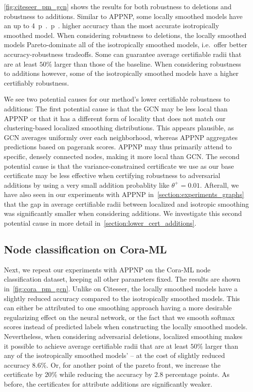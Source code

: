 \autoref{fig:citeseer_pm_gcn} shows the results for both robustness to deletions and robustness to additions.
Similar to APPNP, some locally smoothed models have an up to \SI{4}{p{.}p{.}} higher accuracy than the most accurate isotropically smoothed model.
When considering robustness to deletions, the locally smoothed models Pareto-dominate all of the isotropically smoothed models, i.e.~offer better accuracy-robustness tradeoffs. Some can guarantee average certifiable radii that are at least $50\%$ larger than those of the baseline.
When considering robustness to additions however, some of the isotropically smoothed models have a higher certifiably robustness.

We see two potential causes for our method's lower certifiable robustness to additions:
The first potential cause is that the GCN may be less local than APPNP 
or that it has a different form of locality that does not match our clustering-based localized smoothing distributions.
This appears plausible, as GCN averages uniformly over each neighborhood, whereas APPNP aggregates predictions based on pagerank scores.  APPNP may thus primarily attend to specific, densely connected nodes, making it more local than GCN.
The second potential cause is that the variance-constrained certificate we use as our base certificate may be less effective when certifying robustness to adversarial additions by using a very small addition probablity like $\theta^{+} = 0.01$.
Afterall, we have also seen in our experiments with APPNP in~\autoref{section:experiments_graphs} that the gap in average certifiable radii between localized and isotropic smoothing was significantly smaller when considering additions.
We investigate this second potential cause in more detail in~\autoref{section:lower_cert_additions}.

\subsection{Node classification on Cora-ML}




Next, we repeat our experiments with APPNP on the Cora-ML \citep{McCallum2000,Bojchevski2018} node classification dataset, keeping all other parameters  fixed.
The results are shown in~\autoref{fig:cora_pm_gcn}.
Unlike on Citeseer, the locally smoothed models have a slightly reduced accuracy compared to the isotropically smoothed models.
This can either be attributed to one smoothing approach having a more desirable regularizing effect on the neural network, or the fact that we smooth softmax scores instead of predicted labels when constructing the locally smoothed models.
Nevertheless, when considering adversarial deletions, localized smoothing makes it possible to achieve average certifiable radii that are at least $50\%$ larger than any of the isotropically smoothed models' -- at the cost of slightly reduced accuracy $8.6\%$. Or, for another point of the pareto front, we increase the certificate by $20\%$ while reducing the accuracy by $2.8$ percentage points.
As before, the certificates for attribute additions are significantly weaker.


